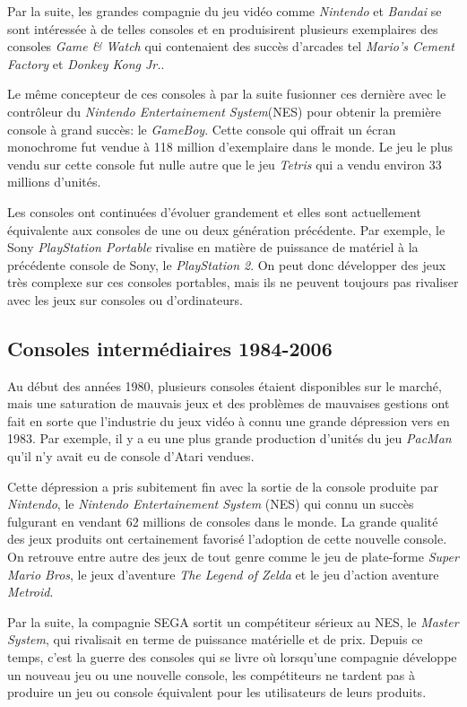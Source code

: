 \documentclass[12pt,oneside,letterpaper,francais]{book}
\begin{document}
Par la suite, les grandes compagnie du jeu vidéo comme
\textit{Nintendo} et \textit{Bandai} se sont intéressée à de telles
consoles et en produisirent plusieurs exemplaires des consoles
\textit{Game \& Watch} qui contenaient des succès d'arcades tel
\textit{Mario's Cement Factory} et \textit{Donkey Kong Jr.}.

Le même concepteur de ces consoles à par la suite fusionner ces
dernière avec le contrôleur du \textit{Nintendo Entertainement
  System}(NES) pour obtenir la première console à grand succès: le
\textit{GameBoy}. Cette console qui offrait un écran monochrome fut
vendue à 118 million d'exemplaire dans le monde. Le jeu le plus vendu
sur cette console fut nulle autre que le jeu \textit{Tetris} qui a
vendu environ 33 millions d'unités.

Les consoles ont continuées d'évoluer grandement et elles sont
actuellement équivalente aux consoles de une ou deux génération
précédente. Par exemple, le Sony \textit{PlayStation Portable}
rivalise en matière de puissance de matériel à la précédente console
de Sony, le \textit{PlayStation 2}. On peut donc développer des jeux
très complexe sur ces consoles portables, mais ils ne peuvent toujours
pas rivaliser avec les jeux sur consoles ou d'ordinateurs.

\subsection{Consoles intermédiaires 1984-2006}
Au début des années 1980, plusieurs consoles étaient disponibles sur
le marché, mais une saturation de mauvais jeux et des problèmes de
mauvaises gestions ont fait en sorte que l'industrie du jeux vidéo à
connu une grande dépression vers en 1983. Par exemple, il y a eu une
plus grande production d'unités du jeu \textit{PacMan} qu'il n'y avait
eu de console d'Atari vendues.

Cette dépression a pris subitement fin avec la sortie de la console
produite par \textit{Nintendo}, le \textit{Nintendo Entertainement
  System} (NES) qui connu un succès fulgurant en vendant 62 millions
de consoles dans le monde. La grande qualité des jeux produits ont
certainement favorisé l'adoption de cette nouvelle console. On
retrouve entre autre des jeux de tout genre comme le jeu de
plate-forme \textit{Super Mario Bros}, le jeux d'aventure \textit{The
  Legend of Zelda} et le jeu d'action aventure \textit{Metroid}.

Par la suite, la compagnie SEGA sortit un compétiteur sérieux au NES,
le \textit{Master System}, qui rivalisait en terme de puissance
matérielle et de prix. Depuis ce temps, c'est la guerre des consoles
qui se livre où lorsqu'une compagnie développe un nouveau jeu ou une
nouvelle console, les compétiteurs ne tardent pas à produire un jeu ou
console équivalent pour les utilisateurs de leurs produits.
\end{document}
